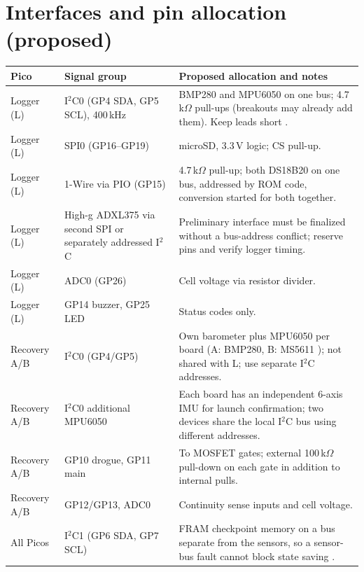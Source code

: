 \section{Interfaces and pin allocation (proposed)}
\small
{}
\begin{tabularx}{\linewidth}{@{}L{22mm}L{40mm}Y@{}}
\toprule{}\textbf{Pico}&\textbf{Signal group}&\textbf{Proposed allocation and notes}\\\midrule
Logger (L) & I$^2$C0 (GP4 SDA, GP5 SCL), 400\,kHz & BMP280 and MPU6050 on one bus; 4.7\,k$\Omega$ pull-ups (breakouts may already add them). Keep leads short \cite{i2cspec}.\\
Logger (L) & SPI0 (GP16--GP19) & microSD, 3.3\,V logic; CS pull-up.\\
Logger (L) & 1-Wire via PIO (GP15) & 4.7\,k$\Omega$ pull-up; both DS18B20 on one bus, addressed by ROM code, conversion started for both together.\\
Logger (L) & High-g ADXL375 via second SPI or separately addressed I$^2$C & Preliminary interface must be finalized without a bus-address conflict; reserve pins and verify logger timing.\\
Logger (L) & ADC0 (GP26) & Cell voltage via resistor divider.\\
Logger (L) & GP14 buzzer, GP25 LED & Status codes only.\\
Recovery A/B & I$^2$C0 (GP4/GP5) & Own barometer plus MPU6050 per board (A: BMP280, B: MS5611 \cite{ms5611ds,mpu6050ds}); not shared with L; use separate I$^2$C addresses.\\
Recovery A/B & I$^2$C0 additional MPU6050 & Each board has an independent 6-axis IMU for launch confirmation; two devices share the local I$^2$C bus using different addresses.\\
Recovery A/B & GP10 drogue, GP11 main & To MOSFET gates; external 100\,k$\Omega$ pull-down on each gate in addition to internal pulls.\\
Recovery A/B & GP12/GP13, ADC0 & Continuity sense inputs and cell voltage.\\
All Picos & I$^2$C1 (GP6 SDA, GP7 SCL) & FRAM checkpoint memory on a bus separate from the sensors, so a sensor-bus fault cannot block state saving \cite{fram}.\\
\bottomrule
\end{tabularx}
\normalsize

